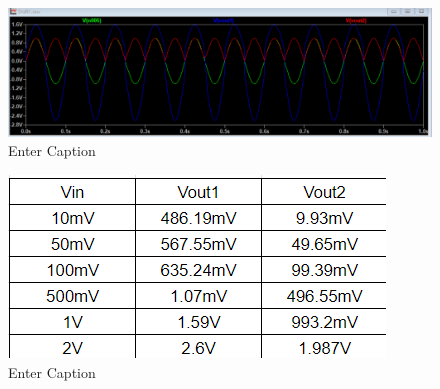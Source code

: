 \begin{figure}
    \centering
    \includegraphics[width=0.5\linewidth]{Secciones/Circuito3/simulacion1v.png}
    \caption{Enter Caption}
    \label{fig:Simulacion1v}
\end{figure}


\begin{figure}
    \centering
    \includegraphics[width=0.5\linewidth]{Secciones/Circuito3/tabla1.png}
    \caption{Enter Caption}
    \label{fig:Tabla1}
\end{figure}









